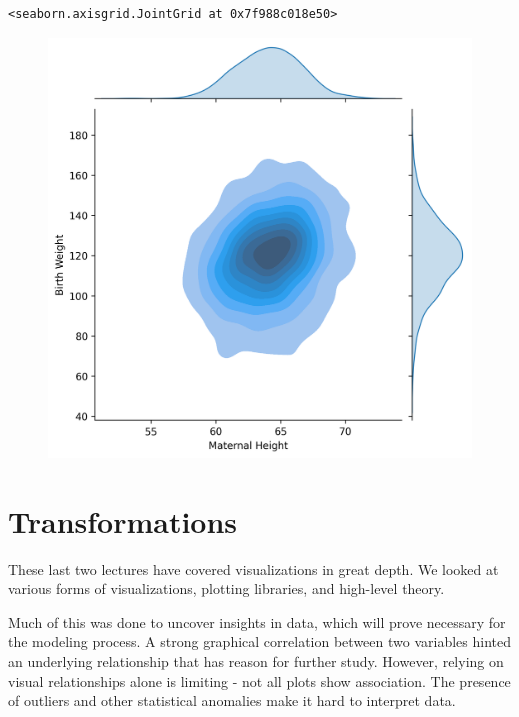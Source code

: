 \documentclass[
  letterpaper,
  DIV=11,
  numbers=noendperiod]{scrreprt}
\begin{document}
\begin{verbatim}
<seaborn.axisgrid.JointGrid at 0x7f988c018e50>
\end{verbatim}

\begin{figure}[H]

{\centering \includegraphics{visualization_2/visualization_2_files/figure-pdf/cell-12-output-2.png}

}

\end{figure}

\hypertarget{transformations}{%
\section{Transformations}\label{transformations}}

These last two lectures have covered visualizations in great depth. We
looked at various forms of visualizations, plotting libraries, and
high-level theory.

Much of this was done to uncover insights in data, which will prove
necessary for the modeling process. A strong graphical correlation
between two variables hinted an underlying relationship that has reason
for further study. However, relying on visual relationships alone is
limiting - not all plots show association. The presence of outliers and
other statistical anomalies make it hard to interpret data.
\end{document}
